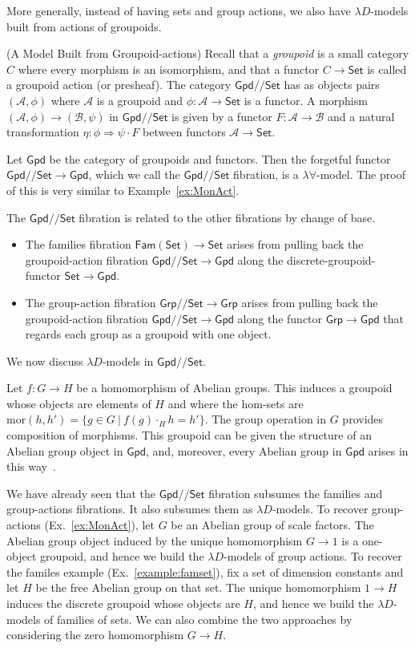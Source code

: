 \documentclass[a4paper,UKenglish]{lipics}
\newcommand{\msf}[1]{\mathsf{#1}} %
\newcommand{\Grp}{\msf{Grp}}
\newcommand{\Set}{\msf{Set}}
\newcommand{\Gpd}{\msf{Gpd}}
\newcommand{\Fam}[1]{\msf{Fam}(#1)}
\newcommand{\A}{\mathcal{A}}
\newcommand{\B}{\mathcal{B}}
\newcommand{\GroupSet}[1]{#1/\!/\Set}
\newcommand{\GrpSet}{\GroupSet{\Grp}}
\newcommand{\GpdSet}{\GroupSet{\Gpd}}
\begin{document}
More generally, instead of having sets and group actions, we also have $\lambda D$-models built from actions of groupoids.

\begin{example}(A Model Built from Groupoid-actions)
\label{ex:presheaves}
Recall that a \emph{groupoid} is a small category $C$ where every morphism is an isomorphism, and that a functor $C\to\Set$ is called a groupoid action (or presheaf). The category $\GpdSet$ has as objects pairs $(\A,\phi)$ where $\A$ is a groupoid and $\phi:\A\to\Set$ is a functor. A morphism $(\A,\phi) \rightarrow (\B,\psi)$ in $\GpdSet$ is given by a functor $F:\A\rightarrow \B$ and a natural transformation $\eta:\phi \Rightarrow \psi \cdot F$ between functors $\A \to\Set$.

Let $\Gpd$ be the category of groupoids and functors. Then the forgetful functor $\GpdSet\to \Gpd$, which we call the $\GpdSet$ fibration, is a $\lambda \forall$-model.
The proof of this is very similar to Example~\ref{ex:MonAct}.

The $\GpdSet$ fibration is related to the other fibrations by change of base.
\begin{itemize}
\item
The families fibration $\Fam\Set\to\Set$ arises from pulling back the groupoid-action fibration
$\GpdSet\to\Gpd$ along the discrete-groupoid-functor $\Set\to\Gpd$.
\item The group-action fibration $\GrpSet\to\Grp$ arises from pulling
  back the groupoid-action fibration $\GpdSet\to\Gpd$ along the functor
  $\Grp\to\Gpd$ that regards each group as a groupoid with one
  object.
\end{itemize}

We now discuss $\lambda D$-models in $\GpdSet$.

Let $f:G\to H$ be a homomorphism of Abelian groups. This induces a groupoid
whose objects are elements of $H$ and where the hom-sets are $\mathrm{mor}(h,h')=\{g\in G~|~f(g)\cdot_Hh=h'\}$. The group operation in $G$ provides
composition of morphisms.
This groupoid can be given the structure of an Abelian group object in
$\Gpd$, and, moreover, every Abelian group in $\Gpd$ arises in this way~\cite{brown-spencer}.

We have already seen that the $\GpdSet$ fibration subsumes the families and
group-actions fibrations. It also subsumes them as $\lambda D$-models.
To recover group-actions (Ex.~\ref{ex:MonAct}),
let $G$ be an Abelian group of scale factors.
The Abelian group object induced by
the unique homomorphism $G\to 1$ is a one-object groupoid,
and hence we build
the $\lambda D$-models of group actions.
To recover the familes example (Ex.~\ref{example:famset}),
fix a set of dimension constants and let $H$ be the
free Abelian group on that set. The unique homomorphism $1\to H$ induces the
discrete groupoid whose objects are $H$, and hence we build the $\lambda D$-%
models of families of sets.
We can also combine the two approaches
by considering the zero homomorphism $G\to H$.
\end{example}
\end{document}
